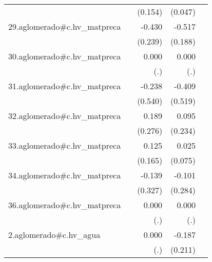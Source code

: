 {\begin{longtable}{l*{4}{D{.}{.}{-1}}}
            &                     &     (0.154)         &     (0.047)         &                     \\
\addlinespace
29.aglomerado#c.hv\_matpreca&                     &      -0.430         &      -0.517\sym{**} &                     \\
            &                     &     (0.239)         &     (0.188)         &                     \\
\addlinespace
30.aglomerado#c.hv\_matpreca&                     &       0.000         &       0.000         &                     \\
            &                     &         (.)         &         (.)         &                     \\
\addlinespace
31.aglomerado#c.hv\_matpreca&                     &      -0.238         &      -0.409         &                     \\
            &                     &     (0.540)         &     (0.519)         &                     \\
\addlinespace
32.aglomerado#c.hv\_matpreca&                     &       0.189         &       0.095         &                     \\
            &                     &     (0.276)         &     (0.234)         &                     \\
\addlinespace
33.aglomerado#c.hv\_matpreca&                     &       0.125         &       0.025         &                     \\
            &                     &     (0.165)         &     (0.075)         &                     \\
\addlinespace
34.aglomerado#c.hv\_matpreca&                     &      -0.139         &      -0.101         &                     \\
            &                     &     (0.327)         &     (0.284)         &                     \\
\addlinespace
36.aglomerado#c.hv\_matpreca&                     &       0.000         &       0.000         &                     \\
            &                     &         (.)         &         (.)         &                     \\
\addlinespace
2.aglomerado#c.hv\_agua&                     &       0.000         &      -0.187         &                     \\
            &                     &         (.)         &     (0.211)         &                     \\

\end{longtable}}
